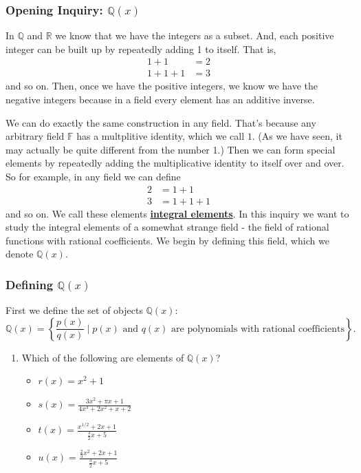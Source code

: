 \documentclass[11pt]{article}
\newenvironment{task}
	{\begin{mdframed}[linecolor=lightgray, linewidth=3pt]\raggedright}
	{\end{mdframed}}
\renewcommand\emph[1]{\underline{\bf{#1}}} %
\theoremstyle{definition}
\begin{document}
\newpage 
\subsubsection{Opening Inquiry: $\mathbb{Q}(x)$}

\begin{task}
In $\mathbb{Q}$ and $\mathbb{R}$ we know that we have the integers as a subset. And, each positive integer can be built up by repeatedly adding 1 to itself.
That is,
\begin{align*}
  1 + 1 &= 2\\
  1+ 1 + 1 &= 3
\end{align*}
and so on. Then, once we have the positive integers, we know we have the negative integers because in a field every element has an additive inverse. 

We can do exactly the same construction in any field. That's because any arbitrary field $\mathbb{F}$ has a multplitive identity, which we call $1$. (As we have seen,
it may actually be quite different from the number 1.) Then we can form special elements by repeatedly adding the multiplicative identity to itself over and
over. So for example, in any field we can define
\begin{align*}
  2 &= 1 + 1\\
  3 &= 1 + 1 + 1
\end{align*}
and so on. We call these elements \emph{integral elements}. In this inquiry we want to study the integral elements of a somewhat strange field - the field
of rational functions with rational coefficients. We begin by defining this field, which we denote $\mathbb{Q}(x)$.

\subsubsection{Defining $\mathbb{Q}(x)$}

First we define the set of objects $\mathbb{Q}(x)$:
\[ \mathbb{Q}(x) = \left\{ \frac{p(x)}{q(x)} \mid p(x) \text{ and }q(x)\text{ are polynomials with rational coefficients} \right\}.\]

\begin{enumerate}
  \item Which of the following are elements of $\mathbb{Q}(x)$?
    \begin{itemize}
      \item $r(x) = x^2 + 1$
        \vspace{.5in}
      \item $s(x) = \frac{3x^2+\pi x + 1}{4x^3 + 2x^2 + x + 2}$
        \vspace{.5in}
      \item $t(x) = \frac{x^{1/2}+2x + 1}{\frac{3}{2}x+5}$
        \vspace{.5in}
      \item $u(x) = \frac{\frac{2}{3}x^2+2x + 1}{\frac{3}{2}x+5}$
        \vspace{.5in}
    \end{itemize}
\end{enumerate}


\end{task}
\end{document}
